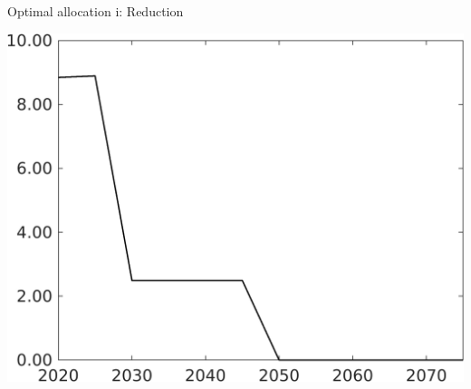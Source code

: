 \documentclass[11pt,aspectratio=169]{beamer}
\begin{document}
\begin{frame}{Optimal allocation i: Reduction}
\begin{minipage}[]{0.32\textwidth}
	\end{minipage}
	\begin{minipage}[]{0.32\textwidth}
	\includegraphics[width=1\textwidth]{../codding_model/own_basedOnFried/optimalPol_elastS_DisuSci/figures/all_1705/Single_OPT_T_NoTaus_Emnet_spillover0_sep1_BN1_ineq0_red0_etaa0.79.png}
\end{minipage}
\end{frame}
\end{document}
